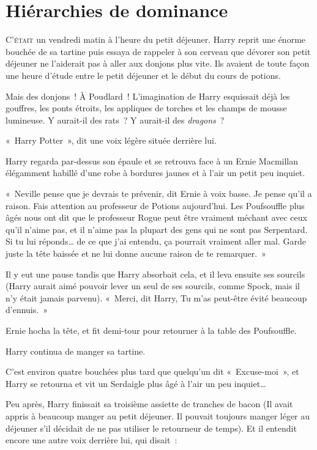 
\chapter{Hiérarchies de dominance}

\lettrine{C}{'était} un vendredi matin à l'heure du petit déjeuner.
Harry reprit une énorme bouchée de sa tartine puis essaya de rappeler à son cerveau que dévorer son petit déjeuner ne l'aiderait pas à aller aux donjons plus vite.
Ils avaient de toute façon une heure d'étude entre le petit déjeuner et le début du cours de potions.

Mais des donjons~!
À Poudlard~!
L'imagination de Harry esquissait déjà les gouffres, les ponts étroits, les appliques de torches et les champs de mousse lumineuse.
Y aurait-il des rats~?
Y aurait-il des \emph{dragons}~?

«~Harry Potter~», dit une voix légère située derrière lui.

Harry regarda par-dessus son épaule et se retrouva face à un Ernie Macmillan élégamment habillé d’une robe à bordures jaunes et à l'air un petit peu inquiet.

«~Neville pense que je devrais te prévenir, dit Ernie à voix basse.
Je pense qu'il a raison.
Fais attention au professeur de Potions aujourd'hui.
Les Poufsouffle plus âgés nous ont dit que le professeur Rogue peut être vraiment méchant avec ceux qu'il n'aime pas, et il n'aime pas la plupart des gens qui ne sont pas Serpentard.
Si tu lui réponds… de ce que j'ai entendu, ça pourrait vraiment aller mal.
Garde juste la tête baissée et ne lui donne aucune raison de te remarquer.~»

Il y eut une pause tandis que Harry absorbait cela, et il leva ensuite ses sourcils (Harry aurait aimé pouvoir lever un seul de ses sourcils, comme Spock, mais il n'y était jamais parvenu).
«~Merci, dit Harry, Tu m'as peut-être évité beaucoup d'ennuis.~»

Ernie hocha la tête, et fit demi-tour pour retourner à la table des Poufsouffle.

Harry continua de manger sa tartine.

C'est environ quatre bouchées plus tard que quelqu'un dit «~Excuse-moi~», et Harry se retourna et vit un Serdaigle plus âgé à l'air un peu inquiet…

Peu après, Harry finissait sa troisième assiette de tranches de bacon (Il avait appris à beaucoup manger au petit déjeuner.
Il pouvait toujours manger léger au déjeuner s'il décidait de ne pas utiliser le retourneur de temps).
Et il entendit encore une autre voix derrière lui, qui disait~:

